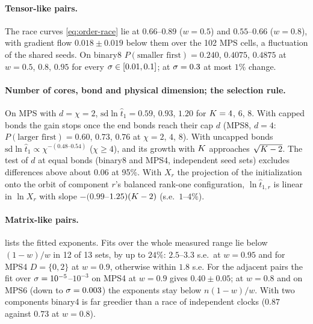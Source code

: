 \paragraph{Tensor-like pairs.}
\empirical{} The race curves \eqref{eq:order-race} lie at $0.66$--$0.89$ ($w=0.5$) and $0.55$--$0.66$ ($w=0.8$), with
gradient flow $0.018\pm0.019$ below them over the 102 MPS cells, a fluctuation of the shared seeds. On binary8
$P(\text{smaller first})=0.240$, $0.4075$, $0.4875$ at $w=0.5$, $0.8$, $0.95$ for every $\sigma\in[0.01,0.1]$; at
$\sigma=0.3$ at most $1\%$ change.

\paragraph{Number of cores, bond and physical dimension; the selection rule.}
\empirical{} On MPS with $d=\chi=2$, $\mathrm{sd}\ln\hat t_1=0.59$, $0.93$, $1.20$ for $K=4$, $6$, $8$. With
capped bonds the gain stops once the end bonds reach their cap $d$ (MPS8, $d=4$: $P(\text{larger first})=0.60$,
$0.73$, $0.76$ at $\chi=2$, $4$, $8$). With uncapped bonds $\mathrm{sd}\ln\hat t_1\propto\chi^{-(0.48\text{--}0.54)}$
($\chi\ge4$), and its growth with $K$ approaches $\sqrt{K-2}$. The test of $d$ at equal bonds (binary8 and MPS4,
independent seed sets) excludes differences above about $0.06$ at 95\%. With $X_r$ the projection of the
initialization onto the orbit of component $r$'s balanced rank-one configuration,
$\ln\hat t_{1,r}$ is linear in $\ln X_r$ with slope $-(0.99$--$1.25)(K-2)$ (s.e.\ $1$--$4\%$).

\paragraph{Matrix-like pairs.}
\empirical{}  lists the fitted exponents. Fits over the whole measured range lie below
$(1-w)/w$ in 12 of 13 sets, by up to $24\%$: $2.5$--$3.3$ s.e.\ at $w=0.95$ and for MPS4 $D=\{0,2\}$ at $w=0.9$,
otherwise within $1.8$ s.e. For the adjacent pairs the fit over $\sigma=10^{-5}$--$10^{-3}$ on MPS4 at $w=0.9$ gives
$0.40\pm0.05$; at $w=0.8$ and on MPS6 (down to $\sigma=0.003$) the exponents stay below $n(1-w)/w$. With two components
binary4 is far greedier than a race of independent clocks ($0.87$ against $0.73$ at $w=0.8$).

